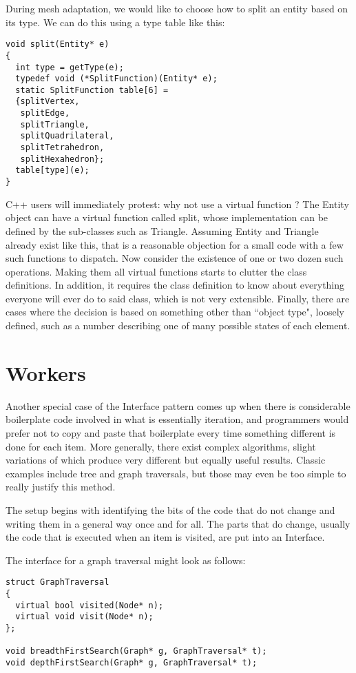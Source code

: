 \documentclass{article}
\begin{document}
During mesh adaptation, we would like to choose how to split an entity
based on its type.
We can do this using a type table like this:

\begin{lstlisting}
void split(Entity* e)
{
  int type = getType(e);
  typedef void (*SplitFunction)(Entity* e);
  static SplitFunction table[6] =
  {splitVertex,
   splitEdge,
   splitTriangle,
   splitQuadrilateral,
   splitTetrahedron,
   splitHexahedron};
  table[type](e);
}
\end{lstlisting}

C++ users will immediately protest: why not use a virtual function ?
The Entity object can have a virtual function called split, whose
implementation can be defined by the sub-classes such as Triangle.
Assuming Entity and Triangle already exist like this, that is a reasonable
objection for a small code with a few such functions to dispatch.
Now consider the existence of one or two dozen such operations.
Making them all virtual functions starts to clutter the class definitions.
In addition, it requires the class definition to know about everything
everyone will ever do to said class, which is not very extensible.
Finally, there are cases where the decision is based on something
other than ``object type", loosely defined, such as a number describing
one of many possible states of each element.

\section{Workers}

Another special case of the Interface pattern comes up when there
is considerable boilerplate code involved in what is essentially iteration,
and programmers would prefer not to copy and paste that boilerplate
every time something different is done for each item.
More generally, there exist complex algorithms, slight variations of which
produce very different but equally useful results.
Classic examples include tree and graph traversals, but those may even be
too simple to really justify this method.

The setup begins with identifying the bits of the code that do not change
and writing them in a general way once and for all.
The parts that do change, usually the code that is executed when an item
is visited, are put into an Interface.

The interface for a graph traversal might look as follows:

\begin{lstlisting}
struct GraphTraversal
{
  virtual bool visited(Node* n);
  virtual void visit(Node* n);
};

void breadthFirstSearch(Graph* g, GraphTraversal* t);
void depthFirstSearch(Graph* g, GraphTraversal* t);
\end{lstlisting}
\end{document}
